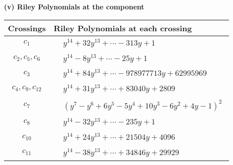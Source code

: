 \documentclass[1p]{elsarticle_modified}
\theoremstyle{definition}
\begin{document}
\newpage\renewcommand{\arraystretch}{1}
\flushleft \textbf{(v) Riley Polynomials at the component}\newline \\
\begin{tabular}{m{50pt}|m{274pt}}
Crossings & \hspace{64pt}Riley Polynomials at each crossing \\
\hline $$\begin{aligned}c_{1}\end{aligned}$$&$\begin{aligned}
&y^{14}+32 y^{13}+\cdots-313 y+1
\end{aligned}$\\
\hline $$\begin{aligned}c_{2},c_{5},c_{6}\end{aligned}$$&$\begin{aligned}
&y^{14}-8 y^{13}+\cdots-25 y+1
\end{aligned}$\\
\hline $$\begin{aligned}c_{3}\end{aligned}$$&$\begin{aligned}
&y^{14}+84 y^{13}+\cdots-978977713 y+62995969
\end{aligned}$\\
\hline $$\begin{aligned}c_{4},c_{9},c_{12}\end{aligned}$$&$\begin{aligned}
&y^{14}+31 y^{13}+\cdots+83040 y+2809
\end{aligned}$\\
\hline $$\begin{aligned}c_{7}\end{aligned}$$&$\begin{aligned}
&(y^7- y^6+6 y^5-5 y^4+10 y^3-6 y^2+4 y-1)^2
\end{aligned}$\\
\hline $$\begin{aligned}c_{8}\end{aligned}$$&$\begin{aligned}
&y^{14}-32 y^{13}+\cdots-235 y+1
\end{aligned}$\\
\hline $$\begin{aligned}c_{10}\end{aligned}$$&$\begin{aligned}
&y^{14}+24 y^{13}+\cdots+21504 y+4096
\end{aligned}$\\
\hline $$\begin{aligned}c_{11}\end{aligned}$$&$\begin{aligned}
&y^{14}-38 y^{13}+\cdots+34846 y+29929
\end{aligned}$\\
\hline
\end{tabular}\\~\\
\end{document}
